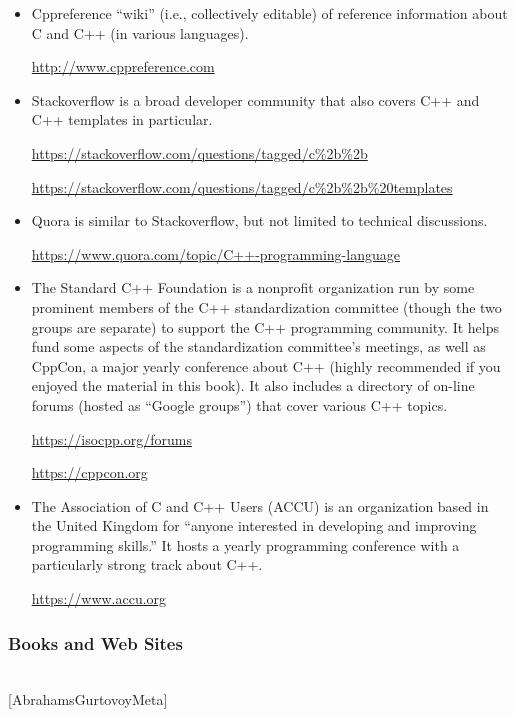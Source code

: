 \begin{itemize}
\item 
Cppreference “wiki” (i.e., collectively editable) of reference information about C and C++ (in various languages).

\url{http://www.cppreference.com}

\item
Stackoverflow is a broad developer community that also covers C++ and C++ templates in particular.

\url{https://stackoverflow.com/questions/tagged/c%2b%2b}

\url{https://stackoverflow.com/questions/tagged/c%2b%2b%20templates}

\item
Quora is similar to Stackoverflow, but not limited to technical discussions.

\url{https://www.quora.com/topic/C++-programming-language}

\item
The Standard C++ Foundation is a nonprofit organization run by some prominent members of the C++ standardization committee (though the two groups are separate) to support the C++ programming community. It helps fund some aspects of the standardization committee’s meetings, as well as CppCon, a major yearly conference about C++ (highly recommended if you enjoyed the material in this book). It also includes a directory of on-line forums (hosted as “Google groups”) that cover various C++ topics.

\url{https://isocpp.org/forums}

\url{https://cppcon.org}

\item
The Association of C and C++ Users (ACCU) is an organization based in the United Kingdom for “anyone interested in developing and improving programming skills.” It hosts a yearly programming conference with a particularly strong track about C++.

\url{https://www.accu.org}
\end{itemize}

\subsubsection*{Books and Web Sites}

\hspace*{\fill} \\ %
{[AbrahamsGurtovoyMeta]}

